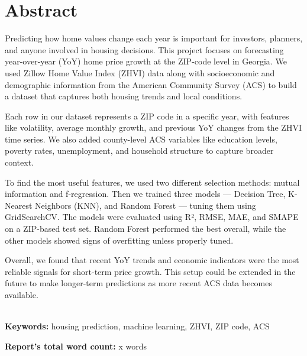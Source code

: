 \chapter*{\center \Large  Abstract}

Predicting how home values change each year is important for investors, planners, and anyone involved in housing decisions. This project focuses on forecasting year-over-year (YoY) home price growth at the ZIP-code level in Georgia. We used Zillow Home Value Index (ZHVI) data along with socioeconomic and demographic information from the American Community Survey (ACS) to build a dataset that captures both housing trends and local conditions.

Each row in our dataset represents a ZIP code in a specific year, with features like volatility, average monthly growth, and previous YoY changes from the ZHVI time series. We also added county-level ACS variables like education levels, poverty rates, unemployment, and household structure to capture broader context.

To find the most useful features, we used two different selection methods: mutual information and f-regression. Then we trained three models — Decision Tree, K-Nearest Neighbors (KNN), and Random Forest — tuning them using GridSearchCV. The models were evaluated using R², RMSE, MAE, and SMAPE on a ZIP-based test set. Random Forest performed the best overall, while the other models showed signs of overfitting unless properly tuned.

Overall, we found that recent YoY trends and economic indicators were the most reliable signals for short-term price growth. This setup could be extended in the future to make longer-term predictions as more recent ACS data becomes available.

~\\[1cm]
\noindent\textbf{Keywords:} housing prediction, machine learning, ZHVI, ZIP code, ACS

\vfill
\noindent
\textbf{Report's total word count:} x words





